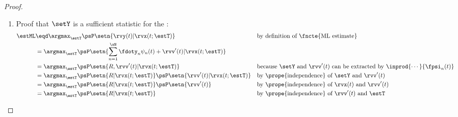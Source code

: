 \begin{proof}
\begin{enumerate}
\item Proof that $\setY$ is a sufficient statistic for the :
\begin{align*}
   \estML
     &\eqd \argmax_{\estT} \psP\setn{\rvy(t)|\rvx(t;\estT)}
     &&    \text{by definition of \fncte{ML estimate}}
   \\&=    \argmax_{\estT} \psP\setn{\sum_{n=1}^\xN\fdoty_n\psi_n(t)+\rvv'(t)|\rvx(t;\estT)}
   \\&=    \argmax_{\estT} \psP\setn{R,\rvv'(t)|\rvx(t;\estT)}
     &&    \text{because $\setY$ and $\rvv'(t)$ can be extracted by  $\inprod{\cdots}{\fpsi_n(t)}$}
   \\&=    \argmax_{\estT} \psP\setn{R|\rvx(t;\estT)}\psP\setn{\rvv'(t)|\rvx(t;\estT)}
     &&    \text{by \prope{independence} of $\setY$ and $\rvv'(t)$}
   \\&=    \argmax_{\estT} \psP\setn{R|\rvx(t;\estT)}\psP\setn{\rvv'(t)}
     &&    \text{by \prope{independence} of $\rvx(t)$ and $\rvv'(t)$}
   \\&=    \argmax_{\estT} \psP\setn{R|\rvx(t;\estT)}
     &&    \text{by \prope{independence} of $\rvv'(t)$ and $\estT$}
\end{align*}
\end{enumerate}
\end{proof}





